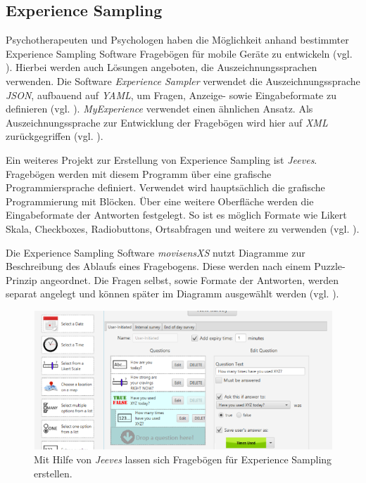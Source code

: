 \subsection{Experience Sampling}
Psychotherapeuten und Psychologen haben die Möglichkeit anhand bestimmter Experience Sampling Software Fragebögen für mobile Geräte zu entwickeln (vgl. \cite{OSFSabri6:online}). Hierbei werden auch Lösungen angeboten, die  Auszeichnungssprachen verwenden. Die Software \emph{Experience Sampler} verwendet die Auszeichnungssprache \emph{JSON}, aufbauend auf \emph{YAML}, um Fragen, Anzeige- sowie Eingabeformate zu definieren (vgl. \cite{OSFSabri6:online}). \emph{MyExperience} verwendet einen ähnlichen Ansatz. Als Auszeichnungssprache zur Entwicklung der Fragebögen wird hier auf \emph{XML} zurückgegriffen (vgl. \cite{theMyExp48:online}).

Ein weiteres Projekt zur Erstellung von Experience Sampling ist \emph{Jeeves}. Fragebögen werden mit diesem Programm über eine grafische Programmiersprache definiert. Verwendet wird hauptsächlich die grafische Programmierung mit Blöcken. Über eine weitere Oberfläche werden die Eingabeformate der Antworten festgelegt. So ist es möglich Formate wie Likert Skala, Checkboxes, Radiobuttons, Ortsabfragen und weitere zu verwenden (vgl. \cite{Rough2017}).

Die Experience Sampling Software \emph{movisensXS} nutzt Diagramme zur Beschreibung des Ablaufs eines Fragebogens. Diese werden nach einem Puzzle-Prinzip angeordnet. Die Fragen selbst, sowie Formate der Antworten, werden separat angelegt und können später im Diagramm ausgewählt werden (vgl. \cite{movisens59:online}).

\begin{figure}[h]
\centering
\includegraphics[width=1\textwidth]{pictures/jeeves}
\caption{Mit Hilfe von \emph{Jeeves} lassen sich Fragebögen für Experience Sampling erstellen. \cite{8e8f4fb047:online}}
\label{jeeves}
\end{figure}



